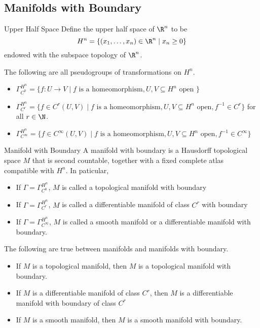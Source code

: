 \documentclass[a4paper]{article}
\begin{document}
\subsection{Manifolds with Boundary}
\begin{defn}{Upper Half Space}{} Define the upper half space of $\R^n$ to be $$H^n=\{(x_1,\dots,x_n)\in\R^n\;|\;x_n\geq 0\}$$ endowed with the subspace topology of $\R^n$. 
\end{defn}

\begin{prp}{}{} The following are all pseudogroups of transformations on $H^n$. 
\begin{itemize}
\item $\Gamma_{C^0}^{{H^n}}=\{f:U\to V\;|\;f\text{ is a homeomorphism}, U,V\subseteq H^n\text{ open }\}$
\item $\Gamma_{C^r}^{{H^n}}=\{f\in C^r(U,V)\;|\;f\text{ is a homeomorphism}, U,V\subseteq H^n\text{ open}, f^{-1}\in C^r\}$ for all $r\in\N$. 
\item $\Gamma_{C^\infty}^{{H^n}}=\{f\in C^\infty(U,V)\;|\;f\text{ is a homeomorphism}, U,V\subseteq H^n\text{ open},f^{-1}\in C^\infty\}$
\end{itemize}
\end{prp}

\begin{defn}{Manifold with Boundary}{} A manifold with boundary is a Hausdorff topological space $M$ that is second countable, together with a fixed complete atlas compatible with $H^n$. In paticular, 
\begin{itemize}
\item If $\Gamma=\Gamma_{C^0}^{{H^n}}$, $M$ is called a topological manifold with boundary
\item If $\Gamma=\Gamma_{C^r}^{{H^n}}$, $M$ is called a differentiable manifold of class $C^r$ with boundary
\item If $\Gamma=\Gamma_{C^\infty}^{{H^n}}$, $M$ is called a smooth manifold or a differentiable manifold with boundary. 
\end{itemize}
\end{defn}

\begin{prp}{}{} The following are true between manifolds and manifolds with boundary. 
\begin{itemize}
\item If $M$ is a topological manifold, then $M$ is a topological manifold with boundary. 
\item If $M$ is a differentiable manifold of class $C^r$, then $M$ is a differentiable manifold with boundary of class $C^r$
\item If $M$ is a smooth manifold, then $M$ is a smooth manifold with boundary. 
\end{itemize}
\end{prp}
\end{document}

